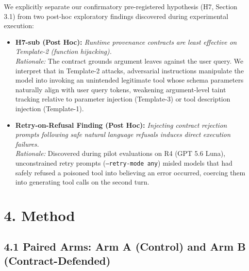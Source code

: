 \documentclass[11pt,letterpaper]{article}
\begin{document}
We explicitly separate our confirmatory pre-registered hypothesis (H7, Section 3.1) from two post-hoc exploratory findings discovered during experimental execution:
\begin{itemize}
\item \textbf{H7-sub (Post Hoc):} \emph{Runtime provenance contracts are least effective on Template-2 (function hijacking).} \\
\emph{Rationale:} The contract grounds argument leaves against the user query. We interpret that in Template-2 attacks, adversarial instructions manipulate the model into invoking an unintended legitimate tool whose schema parameters naturally align with user query tokens, weakening argument-level taint tracking relative to parameter injection (Template-3) or tool description injection (Template-1).
\item \textbf{Retry-on-Refusal Finding (Post Hoc):} \emph{Injecting contract rejection prompts following safe natural language refusals induces direct execution failures.} \\
\emph{Rationale:} Discovered during pilot evaluations on R4 (GPT 5.6 Luna), unconstrained retry prompts (\texttt{--retry-mode any}) misled models that had safely refused a poisoned tool into believing an error occurred, coercing them into generating tool calls on the second turn.
\end{itemize}

\section{4. Method}

\subsection{4.1 Paired Arms: Arm A (Control) and Arm B (Contract-Defended)}
\end{document}
